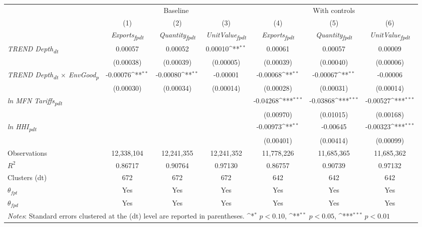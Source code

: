 {
\def\sym#1{\ifmmode^{#1}\else\(^{#1}\)\fi}
\begin{tabular}{l*{6}{c}}
\toprule
&\multicolumn{3}{c}{Baseline}&\multicolumn{3}{c}{With controls}\\\cmidrule(lr){2-4}\cmidrule(lr){5-7}
&(1)&(2)&(3)&(4)&(5)&(6)\\
&\textit{Exports\textsubscript{fpdt}}&\textit{Quantity\textsubscript{fpdt}}&\textit{UnitValue\textsubscript{fpdt}}&\textit{Exports\textsubscript{fpdt}}&\textit{Quantity\textsubscript{fpdt}}&\textit{UnitValue\textsubscript{fpdt}}\\
\midrule
\textit{TREND Depth\textsubscript{dt}} & 0.00057 & 0.00052 & 0.00010\sym{**} & 0.00061 & 0.00057 & 0.00009\\
 & (0.00038) & (0.00039) & (0.00005) & (0.00039) & (0.00040) & (0.00006)\\
\addlinespace
\textit{TREND Depth\textsubscript{dt} $\times$ EnvGood\textsubscript{p}} & -0.00076\sym{**} & -0.00080\sym{**} & -0.00001 & -0.00068\sym{**} & -0.00067\sym{**} & -0.00006\\
 & (0.00030) & (0.00034) & (0.00014) & (0.00028) & (0.00031) & (0.00014)\\
\addlinespace
\textit{ln MFN Tariffs\textsubscript{pdt}} &  &  &  & -0.04268\sym{***} & -0.03868\sym{***} & -0.00527\sym{***}\\
 &  &  &  & (0.00970) & (0.01015) & (0.00168)\\
\addlinespace
\textit{ln HHI\textsubscript{pdt}} &  &  &  & -0.00973\sym{**} & -0.00645 & -0.00323\sym{***}\\
 &  &  &  & (0.00401) & (0.00414) & (0.00099)\\
\midrule
Observations & 12,338,104 & 12,241,355 & 12,241,352 & 11,778,226 & 11,685,365 & 11,685,362\\
$R^{2}$ & 0.86717 & 0.90764 & 0.97130 & 0.86757 & 0.90739 & 0.97132\\
Clusters (dt) & 672 & 672 & 672 & 642 & 642 & 642\\
$\theta_{fpt}$ & Yes & Yes & Yes & Yes & Yes & Yes\\
$\theta_{fpd}$ & Yes & Yes & Yes & Yes & Yes & Yes\\
\bottomrule
\multicolumn{7}{l}{\footnotesize \textit{Notes}: Standard errors clustered at the (dt) level are reported in parentheses. \sym{*} \(p<0.10\), \sym{**} \(p<0.05\), \sym{***} \(p<0.01\)}\\
\end{tabular}
}
